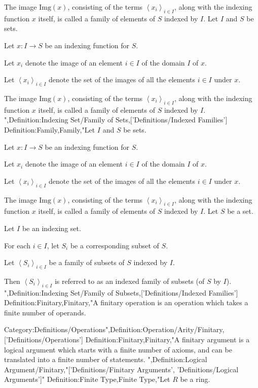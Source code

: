 The image $\mathrm {Img} \left( x \right)$, consisting of the terms $\left\langle x_i \right\rangle_{i \mathop \in I}$, along with the indexing function $x$ itself, is called a family of elements of $S$ indexed by $I$.
Let $I$ and $S$ be sets.

Let $x: I \to S$ be an indexing function for $S$.

Let $x_i$ denote the image of an element $i \in I$ of the domain $I$ of $x$.

Let $\left\langle x_i \right\rangle_{i \mathop \in I}$ denote the set of the images of all the elements $i \in I$ under $x$.


The image $\mathrm {Img} \left( x \right)$, consisting of the terms $\left\langle x_i \right\rangle_{i \mathop \in I}$, along with the indexing function $x$ itself, is called a family of elements of $S$ indexed by $I$.
",Definition:Indexing Set/Family of Sets,['Definitions/Indexed Families']
Definition:Family,Family,"Let $I$ and $S$ be sets.

Let $x: I \to S$ be an indexing function for $S$.

Let $x_i$ denote the image of an element $i \in I$ of the domain $I$ of $x$.

Let $\left\langle x_i \right\rangle_{i \mathop \in I}$ denote the set of the images of all the elements $i \in I$ under $x$.


The image $\mathrm {Img} \left( x \right)$, consisting of the terms $\left\langle x_i \right\rangle_{i \mathop \in I}$, along with the indexing function $x$ itself, is called a family of elements of $S$ indexed by $I$.
Let $S$ be a set.

Let $I$ be an indexing set.

For each $i \in I$, let $S_i$ be a corresponding subset of $S$.

Let $\left\langle S_i \right\rangle_{i \mathop \in I}$ be a family of subsets of $S$ indexed by $I$.


Then $\left\langle S_i \right\rangle_{i \mathop \in I}$ is referred to as an indexed family of subsets (of $S$ by $I$).
",Definition:Indexing Set/Family of Subsets,['Definitions/Indexed Families']
Definition:Finitary,Finitary,"A finitary operation is an operation which takes a finite number of operands.


Category:Definitions/Operations",Definition:Operation/Arity/Finitary,['Definitions/Operations']
Definition:Finitary,Finitary,"A finitary argument is a logical argument which starts with a finite number of axioms, and can be translated into a finite number of statements.
",Definition:Logical Argument/Finitary,"['Definitions/Finitary Arguments', 'Definitions/Logical Arguments']"
Definition:Finite Type,Finite Type,"Let $R$ be a ring.

